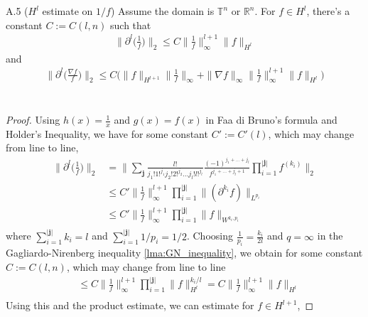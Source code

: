 \documentclass[11pt,letterpaper]{amsart}
\theoremstyle{plain}
\theoremstyle{definition}
\theoremstyle{remark}
\newcommand{\R}{\ensuremath{\mathbb{R}}}   %
\newcommand{\T}{\ensuremath{\mathbb{T}}}   %
\renewcommand{\leq}{\leqslant}
\def\R{\mathbb{R}}
\def\T{\mathbb{T}}
\def\dl{\partial^l}
\begin{document}
\begin{customproposition}{A.5} ($H^l$ estimate on $1/f$)
\label{recip_rho_estimate}
    Assume the domain is $\T^n$ or $\R^n$.  For $f \in H^l$, there's a constant $C := C(l,n)$ such that 
    \begin{align*}
        \Big\| \dl \Big( \frac{1}{f} \Big) \Big\|_2 
            \leq C \Big\| \frac{1}{f} \Big\|_{\infty}^{l+1} \| f \|_{H^l}
    \end{align*}
    and
    \begin{align*}
        \Big\| \dl \Big( \frac{\nabla f}{f} \Big) \Big\|_2 
            \leq C \Big( \|f\|_{H^{l+1}} \Big\|\frac{1}{f} \Big\|_{\infty} 
                    + \|\nabla f\|_{\infty} \Big\| \frac{1}{f} \Big\|_{\infty}^{l+1} \| f \|_{H^l} \Big) \\
    \end{align*}\
    \begin{proof}
        Using $h(x) = \frac{1}{x}$ and $g(x) = f(x)$ in Faa di Bruno's formula and Holder's Inequality, we have 
        for some constant $C' := C'(l)$, which may change from line to line, 
        \begin{align*}
            \Big\| \dl \Big( \frac{1}{f} \Big) \Big\|_2
                &= \Big\| \sum_{\textbf{j}} \frac{l!}{j_1!1!^{j_1} j_2!2!^{j_2} \dots j_l!l!^{j_l}} \frac{(-1)^{j_1 + \dots + j_l}}{f^{j_1 + \dots + j_l + 1}} 
                            \prod_{i=1}^{|\textbf{j}|} f^{(k_i)} \Big\|_2 \\
                &\leq C' \Big\| \frac{1}{f} \Big\|_{\infty}^{l+1}  \prod_{i=1}^{|\textbf{j}|} \| (\partial^{k_i} f) \|_{L^{p_i}} \\
                &\leq C' \Big\| \frac{1}{f} \Big\|_{\infty}^{l+1}  \prod_{i=1}^{|\textbf{j}|} \| f \|_{W^{k_i, p_i}} \\
        \end{align*}
        where $\sum_{i=1}^{|\textbf{j}|} k_i = l$ and $\sum_{i=1}^{|\textbf{j}|} 1/p_i = 1/2$. 
        Choosing $\frac{1}{p_i} = \frac{k_i}{2l}$ and $q=\infty$ in the Gagliardo-Nirenberg 
        inequality \ref{lma:GN_inequality}, we obtain for some constant $C := C(l, n)$, which may change from line to line 
        \begin{align*}
            &\leq C \Big\| \frac{1}{f} \Big\|_{\infty}^{l+1} \prod_{i=1}^{|\textbf{j}|} \| f \|_{H^l}^{k_i/l} 
            = C \Big\| \frac{1}{f} \Big\|_{\infty}^{l+1} \| f \|_{H^l}\\            
        \end{align*}
        Using this and the product estimate, we can estimate for $f \in H^{l+1}$,

\end{proof}
\end{customproposition}
\end{document}
